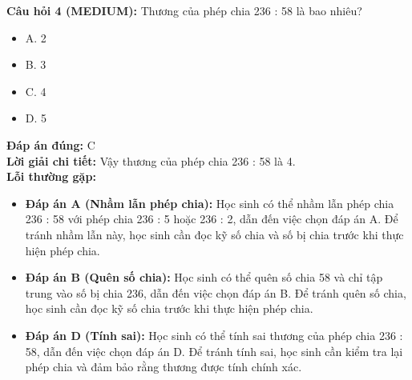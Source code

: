 \documentclass{article}
\begin{document}
\begin{minipage}{\textwidth}
\noindent\textbf{Câu hỏi 4 (MEDIUM):} Thương của phép chia 236 : 58 là bao nhiêu? 
\begin{itemize}[label={}]
    \item A. 2
    \item B. 3
    \item C. 4
    \item D. 5
\end{itemize}
\textbf{Đáp án đúng:} C \\
\textbf{Lời giải chi tiết:} Vậy thương của phép chia 236 : 58 là 4. \\
\textbf{Lỗi thường gặp:}
\begin{itemize}
  \item \textbf{Đáp án A (Nhầm lẫn phép chia):} Học sinh có thể nhầm lẫn phép chia 236 : 58 với phép chia 236 : 5 hoặc 236 : 2, dẫn đến việc chọn đáp án A. Để tránh nhầm lẫn này, học sinh cần đọc kỹ số chia và số bị chia trước khi thực hiện phép chia.
  \item \textbf{Đáp án B (Quên số chia):} Học sinh có thể quên số chia 58 và chỉ tập trung vào số bị chia 236, dẫn đến việc chọn đáp án B. Để tránh quên số chia, học sinh cần đọc kỹ số chia trước khi thực hiện phép chia.
  \item \textbf{Đáp án D (Tính sai):} Học sinh có thể tính sai thương của phép chia 236 : 58, dẫn đến việc chọn đáp án D. Để tránh tính sai, học sinh cần kiểm tra lại phép chia và đảm bảo rằng thương được tính chính xác.
\end{itemize}
\end{minipage}
\vspace{1em}
\end{document}
